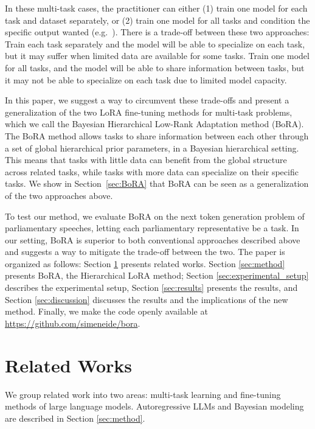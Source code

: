 \documentclass[fullpaper,final]{nldl}
\begin{document}
In these multi-task cases, the practitioner can either (1) train one model for each task and dataset separately, or (2) train one model for all tasks and condition the specific output wanted (e.g.~\cite{Raffel2019}).
There is a trade-off between these two approaches: Train each task separately and the model will be able to specialize on each task, but it may suffer when limited data are available for some tasks. 
Train one model for all tasks, and the model will be able to share information between tasks, but it may not be able to specialize on each task due to limited model capacity.

In this paper, we suggest a way to circumvent these trade-offs and present a generalization of the two LoRA fine-tuning methods for multi-task problems, which we call the Bayesian Hierarchical Low-Rank Adaptation method (BoRA).
The BoRA method allows tasks to share information between each other through a set of global hierarchical prior parameters, in a Bayesian hierarchical setting. 
This means that tasks with little data can benefit from the global structure across related tasks, while tasks with more data can specialize on their specific tasks.
We show in Section~\ref{sec:BoRA} that BoRA can be seen as a generalization of the two approaches above.

To test our method, we evaluate BoRA on the next token generation problem of parliamentary speeches, letting each parliamentary representative be a task. 
In our setting, BoRA is superior to both conventional approaches described above and suggests a way to mitigate the trade-off between the two.
The paper is organized as follows: Section \ref{sec:related_works} presents related works. 
Section \ref{sec:method} presents BoRA, the Hierarchical LoRA method; Section \ref{sec:experimental_setup} describes the experimental setup, Section \ref{sec:results} presents the results, and Section \ref{sec:discussion} discusses the results and the implications of the new method.
Finally, we make the code openly available at \url{https://github.com/simeneide/bora}.



\section{Related Works} \label{sec:related_works}
We group related work into two areas: multi-task learning and fine-tuning methods of large language models. 
Autoregressive LLMs and Bayesian modeling are described in Section \ref{sec:method}.
\end{document}
